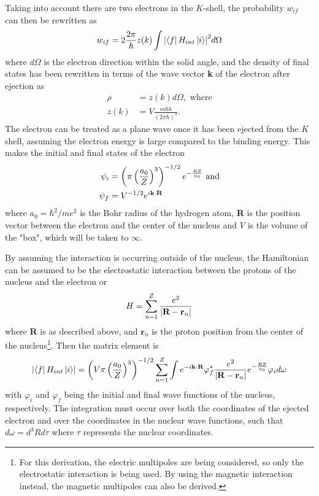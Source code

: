 Taking into account there are two electrons in the $K$-shell, the probability $w_{if}$ can then be rewritten as
\begin{equation}
\label{eq:golden_ic}
    w_{if}=2 \frac{2\pi}{\hbar}z(k)\int\abs{\bra{f}H_{int}\ket{i}}^2d\Omega
\end{equation}
where $d\Omega$ is the electron direction within the solid angle, and the density of final states has been rewritten in terms of the wave vector \textbf{k} of the electron after ejection as 
\begin{align}
    \rho & = z(k)d\Omega, \text{ where} \\
    z(k) & = V\frac{m\hbar k}{(2\pi\hbar)^3}.
\end{align}
The electron can be treated as a plane wave once it has been ejected from the $K$ shell, assuming the electron energy is large compared to the binding energy. This makes the initial and final states of the electron
\begin{subequations}
\begin{align}
    \psi_{i} & = \left(\pi\left(\frac{a_0}{Z}\right)^3\right)^{-1/2}e^{-\frac{RZ}{a_0}} \textnormal{ and}\\
    \psi_{f} & = V^{-1/2}e^{i\textbf{k}\cdot\textbf{R}}
\end{align}
\end{subequations}
where $a_0=\hbar^2/me^2$ is the Bohr radius of the hydrogen atom, \textbf{R} is the position vector between the electron and the center of the nucleus and $V$ is the volume of the "box", which will be taken to $\infty$.

By assuming the interaction is occurring outside of the nucleus, the Hamiltonian can be assumed to be the electrostatic interaction between the protons of the nucleus and the electron or
\begin{equation}
    H=\sum_{n=1}^Z \frac{e^2}{\abs{\textbf{R}-\textbf{r}_n}}
\end{equation}
where \textbf{R} is as described above, and $\textbf{r}_n$ is the proton position from the center of the nucleus\footnote{For this derivation, the electric multipoles are being considered, so only the electrostatic interaction is being used. By using the magnetic interaction instead, the magnetic multipoles can also be derived.}. Then the matrix element is
\begin{equation}
\label{eq:matrix_element_int}
    \abs{\bra{f}H_{int}\ket{i}} = \left(V\pi\left(\frac{a_0}{Z}\right)^3\right)^{-1/2} \sum_{n=1}^Z \int e^{-i\textbf{k}\cdot\textbf{R}}\varphi_{f}^* \frac{e^2}{\abs{\textbf{R}-\textbf{r}_n}} e^{-\frac{RZ}{a_0}}\varphi_{i}d\omega
\end{equation}
with $\varphi_{i}$ and $\varphi_{f}$ being the initial and final wave functions of the nucleus, respectively. The integration must occur over both the coordinates of the ejected electron and over the coordinates in the nuclear wave functions, such that $d\omega=d^3Rd\tau$ where $\tau$ represents the nuclear coordinates.


